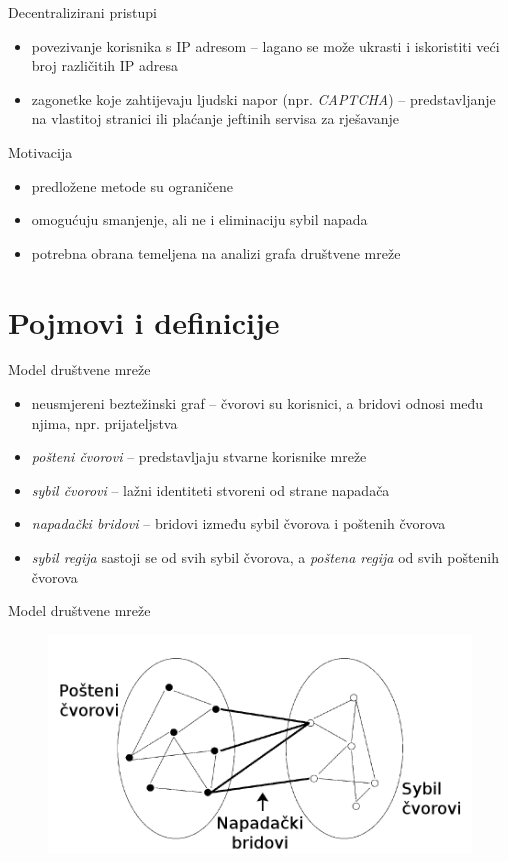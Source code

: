 \documentclass{beamer}
\begin{document}
\begin{frame}{Decentralizirani pristupi}
  \begin{itemize}
    \item povezivanje korisnika s IP adresom -- lagano se može ukrasti i iskoristiti veći broj različitih IP adresa
    \item zagonetke koje zahtijevaju ljudski napor (npr. \textit{CAPTCHA}) -- predstavljanje na vlastitoj stranici ili plaćanje jeftinih servisa za rješavanje
  \end{itemize}
\end{frame}

\begin{frame}{Motivacija}
  \begin{itemize}
    \item predložene metode su ograničene
    \item omogućuju smanjenje, ali ne i eliminaciju sybil napada
    \item potrebna obrana temeljena na analizi grafa društvene mreže
  \end{itemize}
\end{frame}

\section{Pojmovi i definicije}

\begin{frame}{Model društvene mreže}
  \begin{itemize}
    \item neusmjereni beztežinski graf -- čvorovi su korisnici, a bridovi odnosi među njima, npr. prijateljstva
    \item \textit{pošteni čvorovi} -- predstavljaju stvarne korisnike mreže
    \item \textit{sybil čvorovi} -- lažni identiteti stvoreni od strane napadača
    \item \textit{napadački bridovi} -- bridovi između sybil čvorova i poštenih čvorova
    \item \textit{sybil regija} sastoji se od svih sybil čvorova, a \textit{poštena regija} od svih poštenih čvorova
  \end{itemize}
\end{frame}

\begin{frame}{Model društvene mreže}
  \begin{figure}
    \includegraphics[scale=0.3]{attack.png}
  \end{figure}
\end{frame}
\end{document}
